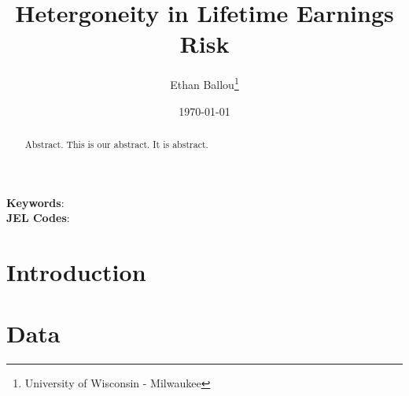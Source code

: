\documentclass[12pt]{article}
\title{Hetergoneity in Lifetime Earnings Risk}
\author{Ethan Ballou\thanks{University of Wisconsin - Milwaukee}\\}
\date{\today}
\begin{document}
\maketitle

\maketitle\thispagestyle{empty}



\begin{abstract}
\begin{singlespace}
\noindent 
Abstract.  This is our abstract.  It is abstract.  
\end{singlespace}
\end{abstract}
 \noindent
 \textbf{Keywords}: \\
\textbf{JEL Codes}: \\






\clearpage
\setcounter{page}{1}
\begin{center}
\end{center}

\section{Introduction}


\section{Data}
\end{document}
